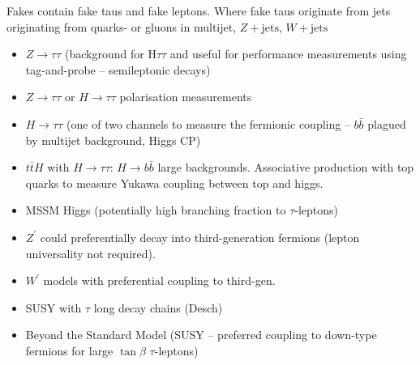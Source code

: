 \begin{figure}[htbp]
\begin{subfigure}[t]{0.48\textwidth}
  \end{subfigure}
  \caption{}
  \label{fig:loosened_wp}
\end{figure}



Fakes contain fake taus and fake leptons. Where fake taus originate from jets
originating from quarks- or gluons in multijet, $Z+\text{jets}$, $W+\text{jets}$

\begin{itemize}
  \item $Z \rightarrow \tau \tau$ (background for H$\tau \tau$ and
    useful for performance measurements using tag-and-probe -- semileptonic
    decays)

  \item $Z \to \tau\tau$ or $H \to \tau\tau$ polarisation measurements

  \item $H \rightarrow \tau \tau$ (one of two channels to measure
    the fermionic coupling -- $b \bar{b}$ plagued by multijet background,
    Higgs CP)

  \item $t\bar{t}H$ with $H \to \tau \tau$: $H \to b \bar{b}$ large backgrounds.
    Associative production with top quarks to measure Yukawa coupling between
    top and higgs.

  \item MSSM Higgs (potentially high branching fraction to $\tau$-leptons)

  \item $Z^\prime$ could preferentially decay into third-generation
    fermions (lepton universality not required).

  \item $W^\prime$ models with preferential coupling to third-gen.

  \item SUSY with $\tau$ \textrightarrow long decay chains (Desch)

  \item Beyond the Standard Model (SUSY -- preferred coupling to down-type
    fermions for large $\tan\beta$ \textrightarrow $\tau$-leptons)
\end{itemize}

